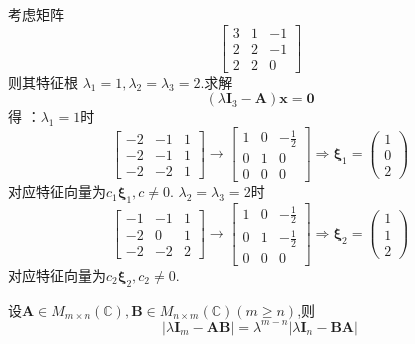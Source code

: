 \begin{brown}
\begin{example}
    考虑矩阵
    \[
    \begin{bmatrix}
        3&1&-1\\
        2&2&-1\\
        2&2&0
    \end{bmatrix}
    \]
    则其特征根
    $\lambda_1=1,\lambda_2=\lambda_3=2$.求解
    \[
    \left(
           \lambda\bm{I}_3-\bm{A}   
    \right)\bm{x}=\bm{0}
    \]得
    ：$\lambda_1=1$时
    \[
      \begin{bmatrix}
        -2&-1& 1\\
        -2&-1&1\\
        -2&-2&1
      \end{bmatrix}\longrightarrow
      \begin{bmatrix}
        1&0&-\frac{1}{2}\\
        0&1&0\\
        0&0&0
      \end{bmatrix}\Longrightarrow
      \bm{\xi}_1=\begin{pmatrix}
        1\\0\\2
      \end{pmatrix}
    \]
    对应特征向量为$c_1\bm{\xi}_1,c\neq 0.$
    $\lambda_2=\lambda_3=2$时
    \[
    \begin{bmatrix}
        -1&-1&1\\
        -2&0&1\\
        -2&-2&2
    \end{bmatrix}\longrightarrow
    \begin{bmatrix}
        1&0&-\frac{1}{2}\\
        0&1&-\frac{1}{2}\\
        0&0&0
    \end{bmatrix}\Longrightarrow
    \bm{\xi}_2=\begin{pmatrix}
        1\\1\\2
    \end{pmatrix}
    \]对应特征向量为$c_2\bm{\xi}_2,c_2\neq 0$.
\end{example}
\end{brown}
\begin{formal}
    \begin{theorem}[特征多项式的降阶公式]\label{thm:特征多项式的降阶公式}
        设$\bm{A}\in M_{m\times n}\left(\mathbb{C}\right),\bm{B}\in M_{n\times m}\left(\mathbb{C}\right)\left(m\geqslant n\right)$,则\[
        \left|
        \lambda\bm{I}_m-\bm{A}\bm{B}
        \right|=\lambda^{m-n}\left|
        \lambda\bm{I}_n-\bm{B}\bm{A}
        \right|
        \]
    \end{theorem}
\end{formal}
